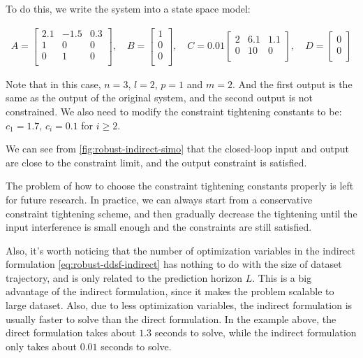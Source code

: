 To do this, we write the system into a state space model:

\begin{align*}
    A = \begin{bmatrix}
        2.1 & -1.5 & 0.3 \\
        1 & 0 & 0 \\
        0 & 1 & 0 \\
    \end{bmatrix}, \quad
    B = \begin{bmatrix}
        1 \\
        0 \\
        0 \\
    \end{bmatrix}, \quad
    C = 0.01 \begin{bmatrix}
        2 & 6.1 & 1.1 \\
        0 & 10 & 0 \\
    \end{bmatrix}, \quad
    D = \begin{bmatrix}
        0 \\
        0 \\
    \end{bmatrix}
\end{align*}

Note that in this case, $n=3$, $l=2$, $p=1$ and $m=2$.
And the first output is the same as the output of the original system, and the second output is not constrained.
We also need to modify the constraint tightening constants to be: $c_1 = 1.7$, $c_i = 0.1$ for $i \geq 2$.

We can see from \cref{fig:robust-indirect-simo} that the closed-loop input and output are close to the constraint limit, and the output constraint is satisfied.


The problem of how to choose the constraint tightening constants properly is left for future research.
In practice, we can always start from a conservative constraint tightening scheme, and then gradually decrease the tightening until the input interference is small enough and the constraints are still satisfied.

Also, it's worth noticing that the number of optimization variables in the indirect formulation \cref{eq:robust-ddsf-indirect} has nothing to do with the size of dataset trajectory, and is only related to the prediction horizon $L$.
This is a big advantage of the indirect formulation, since it makes the problem scalable to large dataset.
Also, due to less optimization variables, the indirect formulation is usually faster to solve than the direct formulation.
In the example above, the direct formulation takes about $1.3$ seconds to solve, while the indirect formulation only takes about $0.01$ seconds to solve.
